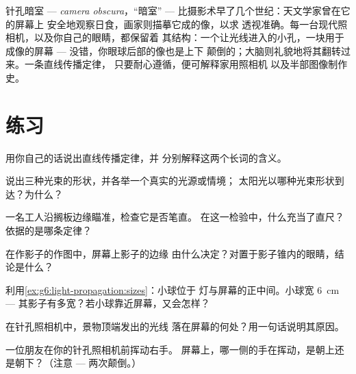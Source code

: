 \begin{remark}[古老而光荣的暗箱]\label{rem:g6:light-propagation:history}
针孔暗室 --- \emph{camera obscura}，“暗室” ---
比摄影术早了几个世纪：天文学家曾在它的屏幕上
安全地观察日食，画家则描摹它成的像，以求
透视准确。每一台现代照相机，以及你自己的眼睛，都保留着
其结构：一个让光线进入的小孔，一块用于
成像的屏幕 --- 没错，你眼球后部的像也是上下
颠倒的；大脑则礼貌地将其翻转过来。一条直线传播定律，
只要耐心遵循，便可解释家用照相机
以及半部图像制作史。
\end{remark}

\section{练习}

\begin{exercise}[$\star$]\label{exo:g6:light-propagation:1}
用你自己的话说出直线传播定律，并
分别解释这两个长词的含义。
\end{exercise}

\begin{exercise}[$\star$]\label{exo:g6:light-propagation:2}
说出三种光束的形状，并各举一个真实的光源或情境；
太阳光以哪种光束形状到达？为什么？
\end{exercise}

\begin{exercise}[$\star$]\label{exo:g6:light-propagation:3}
一名工人沿搁板边缘瞄准，检查它是否笔直。
在这一检验中，什么充当了直尺？依据的是哪条定律？
\end{exercise}

\begin{exercise}[$\star$]\label{exo:g6:light-propagation:4}
在作影子的作图中，屏幕上影子的边缘
由什么决定？对置于影子锥内的眼睛，结论是什么？
\end{exercise}

\begin{exercise}[$\star$]\label{exo:g6:light-propagation:5}
利用\cref{ex:g6:light-propagation:sizes}：小球位于
灯与屏幕的正中间。小球宽 \qty{6}{cm} ---
其影子有多宽？若小球靠近屏幕，又会怎样？
\end{exercise}

\begin{exercise}[$\star$]\label{exo:g6:light-propagation:6}
在针孔照相机中，景物顶端发出的光线
落在屏幕的何处？用一句话说明其原因。
\end{exercise}

\begin{exercise}[$\star$]\label{exo:g6:light-propagation:7}
一位朋友在你的针孔照相机前挥动右手。
屏幕上，哪一侧的手在挥动，是朝上还是朝下？（注意 ---
两次颠倒。）
\end{exercise}

